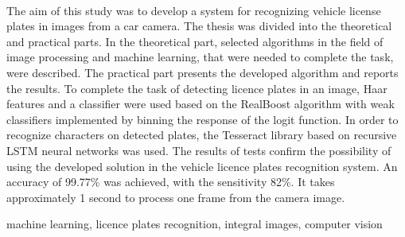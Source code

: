 \begin{center}
    \\[1cm]
\end{center}
The aim of this study was to develop a system for recognizing vehicle license plates in images from a car camera.
The thesis was divided into the theoretical and practical parts.
In the theoretical part, selected algorithms in the field of image processing and machine learning, that were needed to complete the task, were described.
The practical part presents the developed algorithm and reports the results.
To complete the task of detecting licence plates in an image, Haar features and a classifier were used based on the RealBoost algorithm with weak classifiers implemented by binning the response of the logit function.
In order to recognize characters on detected plates, the Tesseract library based on recursive LSTM neural networks was used.
The results of tests confirm the possibility of using the developed solution in the vehicle licence plates recognition system.
An accuracy of 99.77\% was achieved, with the sensitivity 82\%.
It takes approximately 1 second to process one frame from the camera image.

\vspace{10pt}
 machine learning, licence plates recognition, integral images, computer vision